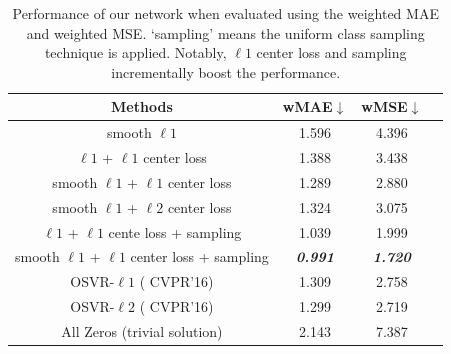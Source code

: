 \documentclass{article}
\begin{document}
\begin{table}[!t]
{\small
\begin{center}
\begin{tabular}{|c|c|c|c|}
\hline
Methods & wMAE$\downarrow$ & wMSE$\downarrow$ \\
\hline
\hline
smooth $\ell 1$ & 1.596 & 4.396 \\
\hline
$\ell 1$ +  $\ell 1$ center loss & 1.388 & 3.438 \\
\hline
smooth $\ell 1$ + $\ell 1$ center loss & 1.289 & 2.880 \\ 
\hline
smooth $\ell 1$ +  $\ell 2$ center loss & 1.324 & 3.075 \\
\hline
$\ell 1$ + $\ell 1$ cente loss + sampling & 1.039 & 1.999 \\ 
\hline
smooth $\ell 1$ + $\ell 1$ center loss + sampling & {\bf \emph{0.991}} & {\bf \emph{1.720}} \\ 
\hline
\hline
OSVR-$\ell 1$ (\cite{Zhao_2016_CVPR} CVPR'16)  & 1.309 & 2.758 \\
\hline
OSVR-$\ell 2$ (\cite{Zhao_2016_CVPR} CVPR'16)  & 1.299 & 2.719 \\
\hline
\hline
All Zeros (trivial solution) & 2.143 & 7.387 \\ 
\hline
\end{tabular}
\end{center}
\vspace{-2mm}
\caption{Performance of our network when evaluated using the weighted MAE and weighted MSE. `sampling' means the uniform class sampling technique is applied. Notably, $\ell 1$ center loss and sampling incrementally boost the performance. }
\label{tab:perf-w}
}
\end{table}
\vspace{-2mm}
\end{document}
